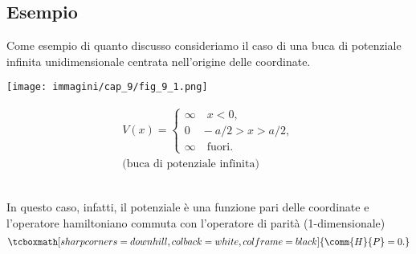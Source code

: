 \subsection*{Esempio}
Come esempio di quanto discusso consideriamo il caso di una buca di potenziale infinita unidimensionale centrata nell'origine delle coordinate.\\
\begin{minipage}{.4\textwidth}
\texttt{[image: immagini/cap\_9/fig\_9\_1.png]}	
\end{minipage}
\begin{minipage}{.55\textwidth}
\begin{align}
V(x)= 
\begin{cases}
\infty \quad x<0,\\
0 \quad -a/2>x>a/2, \\
\infty \quad \textrm{fuori}.
\end{cases}
\\
\textrm{(buca di potenziale infinita)} \nonumber
\end{align}
\end{minipage}\\[0.5cm]

In questo caso, infatti, il potenziale è una funzione pari delle coordinate e l'operatore hamiltoniano commuta con l'operatore di parità (1-dimensionale)
	\begin{equation}
	\tcboxmath[sharp corners=downhill, colback=white, colframe=black]{
		\comm {H}{P}= 0 .
		}
	\end{equation}\\
	
